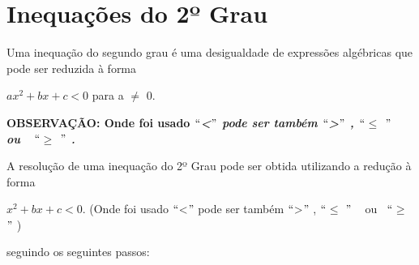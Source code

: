 \section{Inequações do 2º Grau}

\begin{caixa}
\begin{tdefinicao}
 Uma inequação do segundo grau é uma desigualdade de expressões algébricas que pode ser reduzida à forma

$ax^{2} + bx + c < 0$ para a $ \neq $ 0.

\textbf{OBSERVAÇÃO: Onde foi usado \textit{$``$<$"$  pode ser também $``$>$"$ , $``$$ \leq $ $"$ ~ ou~~$``$$ \geq $ $"$  .  }}

\end{tdefinicao}
\end{caixa}
A resolução de uma inequação do 2º Grau pode ser obtida utilizando a redução à forma 

$x^{2} + bx + c < 0$. (Onde foi usado $``$<$"$  pode ser também $``$>$"$ , $``$$ \leq $ $"$ ~ ou~ $``$$ \geq $ $"$ )

seguindo os seguintes passos:

